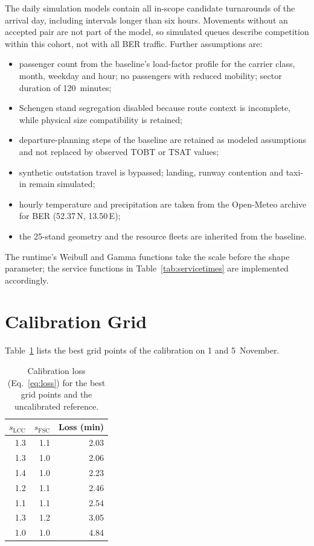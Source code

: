 The daily simulation models contain all in-scope candidate turnarounds of the arrival day, including intervals longer than six hours. Movements without an accepted pair are not part of the model, so simulated queues describe competition within this cohort, not with all BER traffic. Further assumptions are:
\begin{itemize}
\item passenger count from the baseline's load-factor profile for the carrier class, month, weekday and hour; no passengers with reduced mobility; sector duration of 120~minutes;
\item Schengen stand segregation disabled because route context is incomplete, while physical size compatibility is retained;
\item departure-planning steps of the baseline are retained as modeled assumptions and not replaced by observed TOBT or TSAT values;
\item synthetic outstation travel is bypassed; landing, runway contention and taxi-in remain simulated;
\item hourly temperature and precipitation are taken from the Open-Meteo archive for BER (52.37\,N, 13.50\,E);
\item the 25-stand geometry and the resource fleets are inherited from the baseline.
\end{itemize}
The runtime's Weibull and Gamma functions take the scale before the shape parameter; the service functions in Table~\ref{tab:servicetimes} are implemented accordingly.

\section{Calibration Grid}

Table~\ref{tab:grid} lists the best grid points of the calibration on 1 and 5~November.

\begin{table}[htbp]\centering\small
\begin{tabular}{rrr}\hline
$s_{\mathrm{LCC}}$ & $s_{\mathrm{FSC}}$ & Loss (min)\\\hline
1.3 & 1.1 & 2.03\\
1.3 & 1.0 & 2.06\\
1.4 & 1.0 & 2.23\\
1.2 & 1.1 & 2.46\\
1.1 & 1.1 & 2.54\\
1.3 & 1.2 & 3.05\\
1.0 & 1.0 & 4.84\\\hline
\end{tabular}
\caption{Calibration loss (Eq.~\ref{eq:loss}) for the best grid points and the uncalibrated reference.}
\label{tab:grid}
\end{table}

